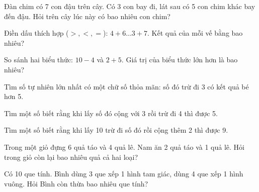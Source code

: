 \begin{ex}
Đàn chim có 7 con đậu trên cây. Có 3 con bay đi, lát sau có 5 con chim khác bay đến đậu. Hỏi trên cây lúc này có bao nhiêu con chim?
\end{ex}

\begin{ex}
Điền dấu thích hợp ($>, <, =$): $4 + 6 \dots 3 + 7$. Kết quả của mỗi vế bằng bao nhiêu?
\end{ex}

\begin{ex}
So sánh hai biểu thức: $10 - 4$ và $2 + 5$. Giá trị của biểu thức lớn hơn là bao nhiêu?
\end{ex}

\begin{ex}
Tìm số tự nhiên lớn nhất có một chữ số thỏa mãn: số đó trừ đi 3 có kết quả bé hơn 5.
\end{ex}

\begin{ex}
Tìm một số biết rằng khi lấy số đó cộng với 3 rồi trừ đi 4 thì được 5.
\end{ex}

\begin{ex}
Tìm một số biết rằng khi lấy 10 trừ đi số đó rồi cộng thêm 2 thì được 9.
\end{ex}

\begin{ex}
Trong một giỏ đựng 6 quả táo và 4 quả lê. Nam ăn 2 quả táo và 1 quả lê. Hỏi trong giỏ còn lại bao nhiêu quả cả hai loại?
\end{ex}

\begin{ex}
Có 10 que tính. Bình dùng 3 que xếp 1 hình tam giác, dùng 4 que xếp 1 hình vuông. Hỏi Bình còn thừa bao nhiêu que tính?
\end{ex}

